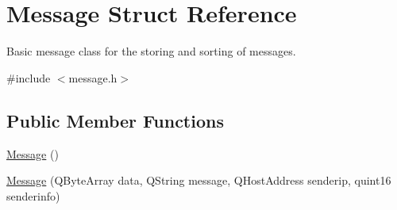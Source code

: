 \hypertarget{struct_message}{}\section{Message Struct Reference}
\label{struct_message}


Basic message class for the storing and sorting of messages.  




{\ttfamily \#include $<$message.\+h$>$}

\subsection*{Public Member Functions}
\begin{DoxyCompactItemize}
\item 
\hyperlink{struct_message_a4fc4f717b634e66070366cb7722d7761}{Message} ()
\item 
\hyperlink{struct_message_aa3f028e2b9674d7eb1712129deb01382}{Message} (Q\+Byte\+Array data, Q\+String message, Q\+Host\+Address senderip, quint16 senderinfo)
\end{DoxyCompactItemize}
